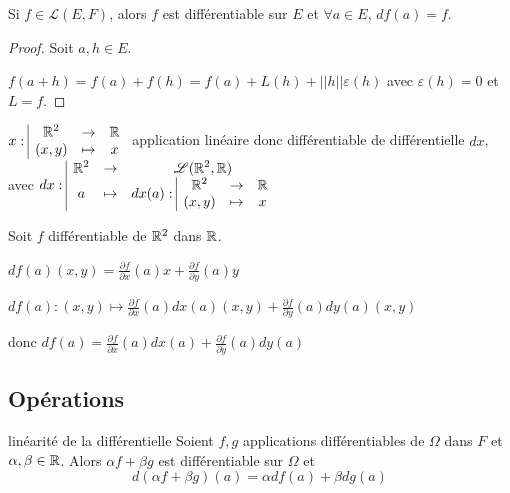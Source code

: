 \begin{exemple}
    Si $f \in \mathscr L(E, F)$, alors $f$ est différentiable sur $E$ et 
    $\forall a \in E$, $df(a) = f$.

    \begin{proof}
        Soit $a, h \in E$. 

        $f(a + h) = f(a) + f(h) = f(a) + L(h) + ||h|| \varepsilon(h)$ avec
        $\varepsilon(h) = 0$ et $L = f$. 
    \end{proof}
\end{exemple}

\begin{exemple}
    $x: \space \begin{array}{|ccc} \displaystyle \mathbb{R}^2 & \to & \displaystyle \mathbb{R} \\ \displaystyle (x, y) & \mapsto & \displaystyle x \end{array}$ application linéaire donc différentiable de différentielle 
    $dx$, avec $dx: \space \begin{array}{|ccc} \displaystyle \mathbb{R}^2 & \to & \displaystyle \mathscr L(\mathbb{R}^2, \mathbb{R}) \\ \displaystyle a & \mapsto & \displaystyle dx(a): \space \begin{array}{|ccc} \displaystyle \mathbb{R}^2 & \to & \displaystyle \mathbb{R} \\ \displaystyle (x, y) & \mapsto & \displaystyle x \end{array} \end{array}$

    Soit $f$ différentiable de $\mathbb{R}^2$ dans $\mathbb{R}$. 

    $\displaystyle df(a)(x, y) = \frac{\partial f }{\partial x }(a) x + \frac{\partial f }{\partial y }(a) y$

    
    $\displaystyle df(a) : (x, y) \mapsto \frac{\partial f }{\partial x }(a) dx(a) (x, y) + \frac{\partial f }{\partial y }(a) dy(a) (x, y)$

    donc $\displaystyle df(a) = \frac{\partial f }{\partial x }(a) dx(a) + \frac{\partial f }{\partial y }(a) dy(a)$
\end{exemple}

\subsection{Opérations }

\begin{proposition}{linéarité de la différentielle}{}
    Soient $f, g$ applications différentiables de $\Omega$ dans $F$ et $\alpha, \beta \in \mathbb{R}$.
    Alors $\alpha f + \beta g$ est différentiable sur $\Omega$ et
    $$d(\alpha f + \beta g)(a) = \alpha df(a) + \beta dg(a)$$   
\end{proposition}



